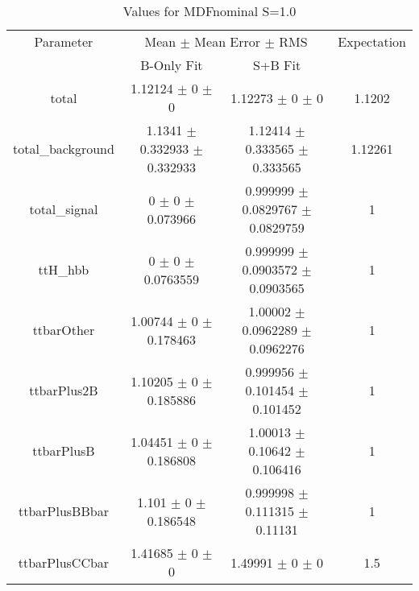\begin{table}
\centering
\caption{Values for MDFnominal S=1.0}
\begin{tabular}{cccc}
\toprule
Parameter & \multicolumn{2}{c}{Mean $\pm$ Mean Error $\pm$ RMS} & Expectation\\
 & B-Only Fit & S+B Fit & \\
\midrule
total & \num{1.12124} $\pm$ \num{0} $\pm$ \num{0} & \num{1.12273} $\pm$ \num{0} $\pm$ \num{0} & \num{1.1202}\\
total\_background & \num{1.1341} $\pm$ \num{0.332933} $\pm$ \num{0.332933} & \num{1.12414} $\pm$ \num{0.333565} $\pm$ \num{0.333565} & \num{1.12261}\\
total\_signal & \num{0} $\pm$ \num{0} $\pm$ \num{0.073966} & \num{0.999999} $\pm$ \num{0.0829767} $\pm$ \num{0.0829759} & \num{1}\\
ttH\_hbb & \num{0} $\pm$ \num{0} $\pm$ \num{0.0763559} & \num{0.999999} $\pm$ \num{0.0903572} $\pm$ \num{0.0903565} & \num{1}\\
ttbarOther & \num{1.00744} $\pm$ \num{0} $\pm$ \num{0.178463} & \num{1.00002} $\pm$ \num{0.0962289} $\pm$ \num{0.0962276} & \num{1}\\
ttbarPlus2B & \num{1.10205} $\pm$ \num{0} $\pm$ \num{0.185886} & \num{0.999956} $\pm$ \num{0.101454} $\pm$ \num{0.101452} & \num{1}\\
ttbarPlusB & \num{1.04451} $\pm$ \num{0} $\pm$ \num{0.186808} & \num{1.00013} $\pm$ \num{0.10642} $\pm$ \num{0.106416} & \num{1}\\
ttbarPlusBBbar & \num{1.101} $\pm$ \num{0} $\pm$ \num{0.186548} & \num{0.999998} $\pm$ \num{0.111315} $\pm$ \num{0.11131} & \num{1}\\
ttbarPlusCCbar & \num{1.41685} $\pm$ \num{0} $\pm$ \num{0} & \num{1.49991} $\pm$ \num{0} $\pm$ \num{0} & \num{1.5}\\
\bottomrule
\end{tabular}
\end{table}